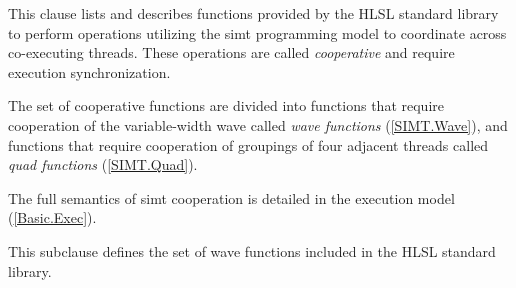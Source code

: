 
\p This clause lists and describes functions provided by the HLSL standard
library to perform operations utilizing the \acrshort{simt} programming model to
coordinate across co-executing threads. These operations are called
\textit{cooperative} and require execution synchronization.

\p The set of cooperative functions are divided into functions that require
cooperation of the variable-width \gls{wave} called \textit{wave functions}
(\ref{SIMT.Wave}), and functions that require cooperation of groupings of four
adjacent threads called \textit{quad functions} (\ref{SIMT.Quad}).

\p The full semantics of \acrshort{simt} cooperation is detailed in the
execution model (\ref{Basic.Exec}).


\p This subclause defines the set of \gls{wave} functions included in the
HLSL standard library.


